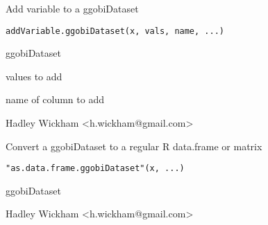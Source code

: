 \documentclass{article}
\begin{document}
\begin{Description}\relax
Add variable to a ggobiDataset
\end{Description}
\begin{Usage}
\begin{verbatim}addVariable.ggobiDataset(x, vals, name, ...)\end{verbatim}
\end{Usage}
\begin{Arguments}
\begin{ldescription}
\item[\code{x}] ggobiDataset
\item[\code{vals}] values to add
\item[\code{name}] name of column to add
\item[\code{...}] 
\end{ldescription}
\end{Arguments}
\begin{Details}\relax
\end{Details}
\begin{Author}\relax
Hadley Wickham <h.wickham@gmail.com>
\end{Author}
\begin{Examples}
\begin{ExampleCode}\end{ExampleCode}
\end{Examples}

\begin{Description}\relax
Convert a ggobiDataset to a regular R data.frame or matrix
\end{Description}
\begin{Usage}
\begin{verbatim}"as.data.frame.ggobiDataset"(x, ...)\end{verbatim}
\end{Usage}
\begin{Arguments}
\begin{ldescription}
\item[\code{x}] ggobiDataset
\item[\code{...}] 
\end{ldescription}
\end{Arguments}
\begin{Details}\relax
\end{Details}
\begin{Author}\relax
Hadley Wickham <h.wickham@gmail.com>
\end{Author}
\begin{Examples}
\begin{ExampleCode}\end{ExampleCode}
\end{Examples}
\end{document}
